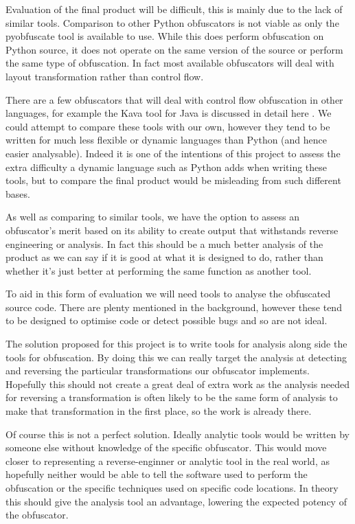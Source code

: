 \documentclass{report}
\begin{document}
Evaluation of the final product will be difficult, this is mainly due to the lack of similar tools.
Comparison to other Python obfuscators is not viable as only the pyobfuscate tool is available to
use. While this does perform obfuscation on Python source, it does not operate on the same version of
the source or perform the same type of obfuscation. In fact most available obfuscators will deal with
layout transformation rather than control flow.

There are a few obfuscators that will deal with control flow obfuscation in other languages, for example
the Kava tool for Java is discussed in detail here \cite{taxobftrans}. We could attempt to compare these
tools with our own, however they tend to be written for much less flexible or dynamic languages than
Python (and hence easier analysable). Indeed it is one of the intentions of this project to assess the
extra difficulty a dynamic language such as Python adds when writing these tools, but to compare the final
product would be misleading from such different bases.

As well as comparing to similar tools, we have the option to assess an obfuscator's merit based on
its ability to create output that withstands reverse engineering or analysis. In fact this should be
a much better analysis of the product as we can say if it is good at what it is designed to do, rather
than whether it's just better at performing the same function as another tool.

To aid in this form of evaluation we will need tools to analyse the obfuscated source code. There are plenty
mentioned in the background, however these tend to be designed to optimise code or detect possible bugs and so
are not ideal.

The solution proposed for this project is to write tools for analysis along side the tools for obfuscation.
By doing this we can really target the analysis at detecting and reversing the particular transformations
our obfuscator implements. Hopefully this should not create a great deal of extra work as the analysis
needed for reversing a transformation is often likely to be the same form of analysis to make that
transformation in the first place, so the work is already there.

Of course this is not a perfect solution. Ideally analytic tools would be written by someone else without
knowledge of the specific obfuscator. This would move closer to representing a reverse-enginner or analytic
tool in the real world, as hopefully neither would be able to tell the software used to perform the obfuscation
or the specific techniques used on specific code locations. In theory this should give the analysis tool an
advantage, lowering the expected potency of the obfuscator.
\end{document}
